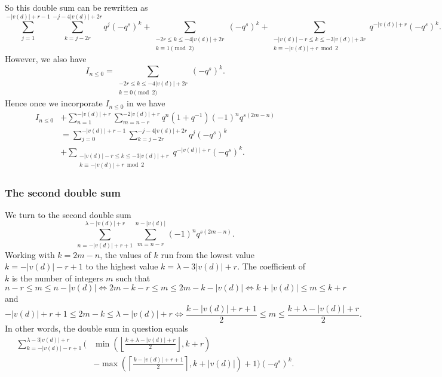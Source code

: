 So this double sum can be rewritten as
\[ \sum_{j=1}^{-|v(d)|+r-1} \sum_{k = j - 2r}^{-j - 4|v(d)| + 2r} q^j (-q^s)^k
  + \sum_{\substack{-2r \le k \le -4|v(d)|+2r \\ k \equiv 1 \pmod 2}} (-q^s)^k
  + \sum_{\substack{-|v(d)|-r \le k \le -3|v(d)|+3r \\ k \equiv -|v(d)|+r \bmod 2}}
    q^{-|v(d)|+r} (-q^s)^k. \]
However, we also have
\[ I_{n \le 0} =
  \sum_{\substack{-2r \le k \le -4|v(d)|+2r \\ k \equiv 0 \pmod 2}} (-q^s)^k. \]
Hence once we incorporate $I_{n \le 0}$ in we have
\begin{align*}
  I_{n \le 0}
  &+ \sum_{n=1}^{-|v(d)|+r} \sum_{m=n-r}^{-2|v(d)|+r} q^{n} \left( 1 + q^{-1} \right) (-1)^n q^{s(2m-n)} \\
  &= \sum_{j=0}^{-|v(d)|+r-1} \sum_{k = j - 2r}^{-j - 4|v(d)| + 2r} q^j (-q^s)^k \\
  &+ \sum_{\substack{-|v(d)|-r \le k \le -3|v(d)|+r \\ k \equiv -|v(d)|+r \bmod 2}}
    q^{-|v(d)|+r} (-q^s)^k.
\end{align*}

\subsubsection{The second double sum}
We turn  to the second double sum
\[ \sum_{n=-|v(d)|+r+1}^{\lambda-|v(d)|+r} \sum_{m=n-r}^{n-|v(d)|} (-1)^n q^{s(2m-n)}. \]
Working with $k = 2m-n$,
the values of $k$ run from the lowest value $k = - |v(d)| - r + 1$
to the highest value $k = \lambda - 3|v(d)| + r$.
The coefficient of $k$ is the number of integers $m$ such that
\[ n-r \le m \le n-|v(d)| \iff 2m-k-r \le m \le 2m-k-|v(d)| \iff k+|v(d)| \le m \le k+r \]
and
\[ -|v(d)|+r+1 \le 2m-k \le \lambda - |v(d)| + r
  \iff \frac{k-|v(d)|+r+1}{2} \le m \le \frac{k+\lambda-|v(d)|+r}{2}. \]
In other words, the double sum in question equals
\begin{align*}
  \sum_{k=-|v(d)|-r+1}^{\lambda-3|v(d)|+r}
  \bigg( & \min\left( \left\lfloor \frac{k+\lambda-|v(d)|+r}{2} \right\rfloor, k+r \right) \\
  & - \max\left( \left\lceil \frac{k-|v(d)|+r+1}{2} \right\rceil, k+|v(d)| \right) + 1 \bigg) (-q^s)^k.
\end{align*}

